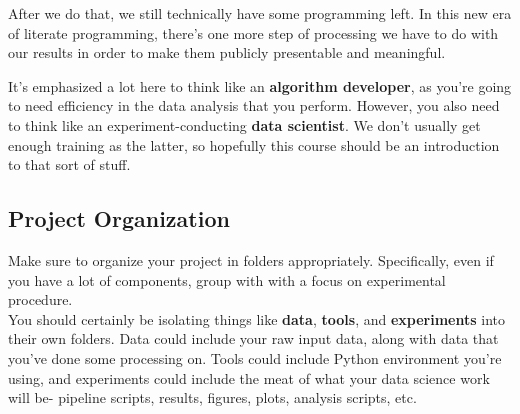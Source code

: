 \documentclass[english, 10pt]{article}
\begin{document}
\hfill \break After we do that, we still technically have some programming left. In this new era of literate programming, there's one more step of processing we have to do with our results in order to make them publicly presentable and meaningful.\\






\hfill \break It's emphasized a lot here to think like an \textbf{algorithm developer}, as you're going to need efficiency in the data analysis that you perform. However, you also need to think like an experiment-conducting \textbf{data scientist}. We don't usually get enough training as the latter, so hopefully this course should be an introduction to that sort of stuff.

\subsection{Project Organization}

Make sure to organize your project in folders appropriately. Specifically, even if you have a lot of components, group with with a focus on experimental procedure.\\

You should certainly be isolating things like \textbf{data}, \textbf{tools}, and \textbf{experiments} into their own folders. Data could include your raw input data, along with data that you've done some processing on. Tools could include Python environment you're using, and experiments could include the meat of what your data science work will be- pipeline scripts, results, figures, plots, analysis scripts, etc.
\end{document}
